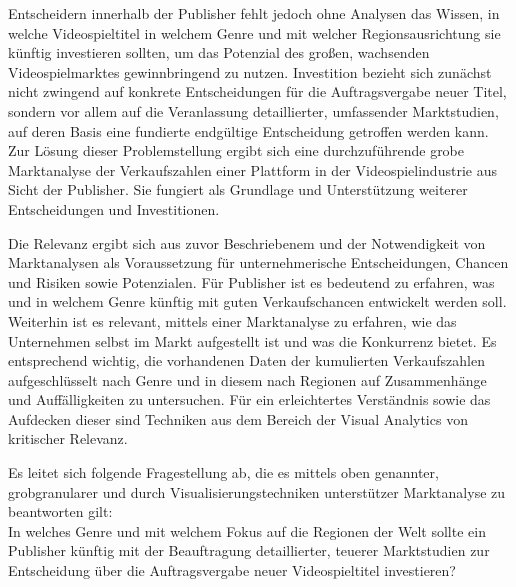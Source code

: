 \documentclass[usegeometry=true]{scrartcl}
\begin{document}
Entscheidern innerhalb der Publisher fehlt jedoch ohne Analysen das Wissen, in welche Videospieltitel in welchem Genre und mit welcher Regionsausrichtung sie künftig investieren sollten, 
um das Potenzial des großen, wachsenden Videospielmarktes gewinnbringend zu nutzen.
Investition bezieht sich zunächst nicht zwingend auf konkrete Entscheidungen für die Auftragsvergabe neuer Titel, 
sondern vor allem auf die Veranlassung detaillierter, umfassender Marktstudien, auf deren Basis eine fundierte endgültige Entscheidung getroffen werden kann.
Zur Lösung dieser Problemstellung ergibt sich eine durchzuführende grobe Marktanalyse der Verkaufszahlen einer Plattform in der Videospielindustrie aus Sicht der Publisher.
Sie fungiert als Grundlage und Unterstützung weiterer Entscheidungen und Investitionen.

Die Relevanz ergibt sich aus zuvor Beschriebenem und der Notwendigkeit von Marktanalysen als Voraussetzung für unternehmerische Entscheidungen, Chancen und Risiken sowie Potenzialen.\cite{Fleig.2020}
Für Publisher ist es bedeutend zu erfahren, was und in welchem Genre künftig mit guten Verkaufschancen entwickelt werden soll.
Weiterhin ist es relevant, mittels einer Marktanalyse zu erfahren, wie das Unternehmen selbst im Markt aufgestellt ist und was die Konkurrenz bietet. 
Es entsprechend wichtig, die vorhandenen Daten der kumulierten Verkaufszahlen aufgeschlüsselt nach Genre und in diesem nach Regionen auf Zusammenhänge und Auffälligkeiten zu untersuchen. 
Für ein erleichtertes Verständnis sowie das Aufdecken dieser sind Techniken aus dem Bereich der Visual Analytics von kritischer Relevanz.

Es leitet sich folgende Fragestellung ab, die es mittels oben genannter, grobgranularer und durch Visualisierungstechniken unterstützer Marktanalyse zu beantworten gilt:\\
In welches Genre und mit welchem Fokus auf die Regionen der Welt sollte ein Publisher künftig mit der Beauftragung detaillierter, teuerer Marktstudien zur Entscheidung über die Auftragsvergabe neuer Videospieltitel investieren?
\end{document}

